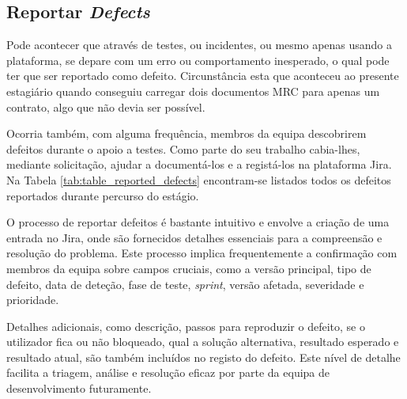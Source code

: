     \subsection{Reportar \textit{Defects}}\label{sub:reportar_defects}

        Pode acontecer que através de testes, ou incidentes, ou mesmo apenas usando a plataforma, se depare com um erro ou comportamento inesperado, o qual pode ter que ser reportado como defeito. Circunstância esta que aconteceu ao presente estagiário quando conseguiu carregar dois documentos MRC para apenas um contrato, algo que não devia ser possível. 

        Ocorria também, com alguma frequência, membros da equipa descobrirem defeitos durante o apoio a testes. Como parte do seu trabalho cabia-lhes, mediante solicitação,  
        ajudar a documentá-los e a registá-los na plataforma Jira. Na Tabela \ref{tab:table_reported_defects} encontram-se listados todos os defeitos reportados durante percurso do estágio.

        O processo de reportar defeitos é bastante intuitivo e envolve a criação de uma entrada no Jira, onde são fornecidos detalhes essenciais para a compreensão e resolução do problema. Este processo implica frequentemente a confirmação com membros da equipa sobre campos cruciais, como a versão principal, tipo de defeito, data de deteção, fase de teste, \textit{sprint}, versão afetada, severidade e prioridade.

        Detalhes adicionais, como descrição, passos para reproduzir o defeito, se o utilizador fica ou não bloqueado, qual a solução alternativa, resultado esperado e resultado atual, são também incluídos no registo do defeito. Este nível de detalhe facilita a triagem, análise e resolução eficaz por parte da equipa de desenvolvimento futuramente.

